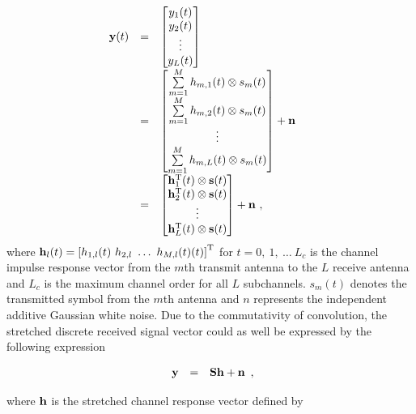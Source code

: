 \documentclass[a4paper,10pt,fleqn, twocolumn]{IEEEtran}
\newcommand{\bh}{{\bf h}}
\newcommand{\bH}{{\bf H}}
\newcommand{\bs}{{\bf s}}
\newcommand{\bn}{{\bf n}}
\newcommand{\by}{{\bf y}}
\newcommand{\bS}{{\bf S}}
\begin{document}
\begin{equation}\hspace{-0.20in}
\begin{array}{rcl}
\by(t)&=&\left[\begin{matrix}y_{1}(t)\\ y_{2}(t)\\ \vdots \\
y_{L}(t)\end{matrix}\right]\\
&=&\left[\begin{matrix}\sum\limits_{m=1}^{M}h_{m,1}(t)\otimes s_m(t)\\ \sum\limits_{m=1}^{M}h_{m,2}(t)\otimes s_m(t)\\ \vdots \\
\sum\limits_{m=1}^{M}h_{m,L}(t)\otimes
s_m(t)\end{matrix}\right]+\bn\\
&=&\left[\begin{matrix}\bh_{1}^{\rm T}(t)\otimes \bs(t)\\ \bh_{2}^{\rm T}(t)\otimes \bs(t)\\ \vdots \\
\bh_{L}^{\rm T}(t)\otimes \bs(t)\end{matrix}\right]+\bn\ ,
\end{array}
\end{equation}
\noindent where $\bh_{l}(t)=\left[h_{1,l}(t)\ h_{2,l}\ \ldots\
h_{M,l}(t)(t)\right]^{\rm T}$ for $t=0,\ 1,\ \ldots\ L_{c}$ is the
channel impulse response vector from the $m$th transmit antenna to
the $L$ receive antenna and $L_{c}$ is the maximum channel order
for all $L$ subchannels. $s_m(t)$ denotes the transmitted symbol
from the $m$th antenna and $n$ represents the independent additive
Gaussian white noise. Due to the commutativity of convolution, the
stretched discrete received signal vector could as well be
expressed by the following expression

\begin{equation}\hspace{-0.00in}
\begin{array}{rcl}
\by&=&\bS\bh+\bn
\end{array},
\end{equation}

\noindent where $\bh$ is the stretched channel response vector
defined by
\end{document}
